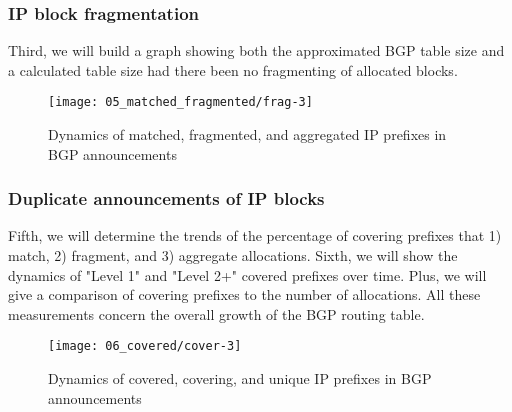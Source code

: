 \subsubsection{IP block fragmentation}
Third, we will build a graph showing both the approximated BGP table size and a calculated table size had there been no fragmenting of allocated blocks.

\begin{figure}[htbp]
	\centering
		\texttt{[image: 05\_matched\_fragmented/frag-3]}
	\caption{Dynamics of matched, fragmented, and aggregated IP prefixes in BGP announcements}
	\label{fig:fragmentation}
\end{figure}

\subsubsection{Duplicate announcements of IP blocks}
Fifth, we will determine the trends of the percentage of covering prefixes that 1) match, 2) fragment, and 3) aggregate allocations.
Sixth, we will show the dynamics of "Level 1" and "Level 2+" covered prefixes over time. Plus, we will give a comparison of covering prefixes to the number of allocations.  All these measurements concern the overall growth of the BGP routing table.

\begin{figure}[htbp]
	\centering
		\texttt{[image: 06\_covered/cover-3]}
	\caption{Dynamics of covered, covering, and unique IP prefixes in BGP announcements}
	\label{fig:label}
\end{figure}
